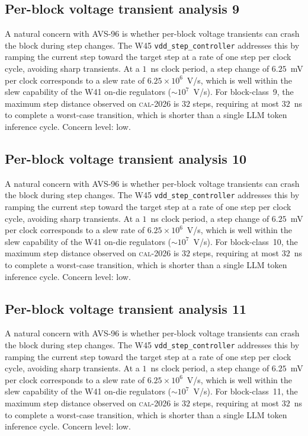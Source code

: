 \subsection{Per-block voltage transient analysis 9}

A natural concern with AVS-96 is whether per-block voltage transients
can crash the block during step changes. The W45 \texttt{vdd\_step\_controller} addresses this by ramping the current
step toward the target step at a rate of one step per clock cycle,
avoiding sharp transients. At a $1$~ns clock period, a step change of
$6.25$~mV per clock corresponds to a slew rate of $6.25\times 10^6$~V/s,
which is well within the slew capability of the W41 on-die regulators
($\sim 10^7$~V/s). For block-class~9, the maximum step distance
observed on \textsc{cal-2026} is $32$ steps, requiring at most $32$~ns
to complete a worst-case transition, which is shorter than a single
LLM token inference cycle. Concern level: low.


\subsection{Per-block voltage transient analysis 10}

A natural concern with AVS-96 is whether per-block voltage transients
can crash the block during step changes. The W45 \texttt{vdd\_step\_controller} addresses this by ramping the current
step toward the target step at a rate of one step per clock cycle,
avoiding sharp transients. At a $1$~ns clock period, a step change of
$6.25$~mV per clock corresponds to a slew rate of $6.25\times 10^6$~V/s,
which is well within the slew capability of the W41 on-die regulators
($\sim 10^7$~V/s). For block-class~10, the maximum step distance
observed on \textsc{cal-2026} is $32$ steps, requiring at most $32$~ns
to complete a worst-case transition, which is shorter than a single
LLM token inference cycle. Concern level: low.


\subsection{Per-block voltage transient analysis 11}

A natural concern with AVS-96 is whether per-block voltage transients
can crash the block during step changes. The W45 \texttt{vdd\_step\_controller} addresses this by ramping the current
step toward the target step at a rate of one step per clock cycle,
avoiding sharp transients. At a $1$~ns clock period, a step change of
$6.25$~mV per clock corresponds to a slew rate of $6.25\times 10^6$~V/s,
which is well within the slew capability of the W41 on-die regulators
($\sim 10^7$~V/s). For block-class~11, the maximum step distance
observed on \textsc{cal-2026} is $32$ steps, requiring at most $32$~ns
to complete a worst-case transition, which is shorter than a single
LLM token inference cycle. Concern level: low.


